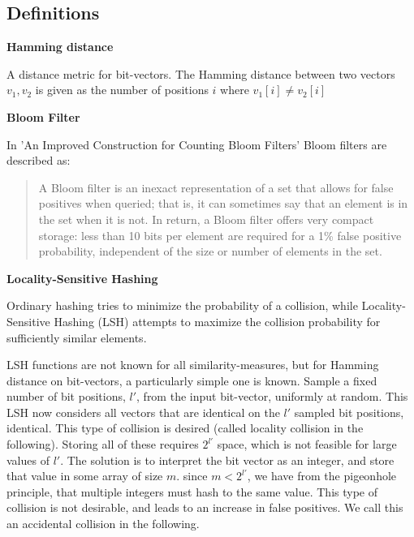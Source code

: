 \documentclass[a4paper,11pt]{article}
\begin{document}
\subsection{Definitions}
\begin{description}
\item \textbf{Hamming distance}

A distance metric for bit-vectors. The Hamming distance between two vectors $v_1, v_2$ is given as the number of positions $i$ where $v_1[i] \neq v_2[i]$

\item \textbf{Bloom Filter}

In 'An Improved Construction for Counting Bloom Filters' \cite{paper:bloom} Bloom filters are described as:
\begin{quotation}
A Bloom filter is an inexact representation of a set that allows for false positives when queried; that is, it can sometimes say that an element is in the set when it is not. In return, a Bloom filter offers very compact storage: less than 10 bits per element are required for a 1\% false positive probability, independent of the size or number of elements in the set.
\end{quotation}


\item \textbf{Locality-Sensitive Hashing}
\label{sec:lsh}

Ordinary hashing tries to minimize the probability of a collision, while Locality-Sensitive Hashing (LSH) attempts to maximize the collision probability for sufficiently similar elements.

LSH functions are not known for all similarity-measures, but for Hamming distance on bit-vectors, a particularly simple one is known.
Sample a fixed number of bit positions, $l'$, from the input bit-vector, uniformly at random. This LSH now considers all vectors that are identical on the $l'$ sampled bit positions, identical. This type of collision is desired (called locality collision in the following). Storing all of these requires $2^{l'}$ space, which is not feasible for large values of $l'$. The solution is to interpret the bit vector as an integer, and store that value in some array of size $m$. since $m < 2^{l'}$, we have from the pigeonhole principle, that multiple integers must hash to the same value. This type of collision is not desirable, and leads to an increase in false positives. We call this an accidental collision in the following.


\end{description}
\end{document}
